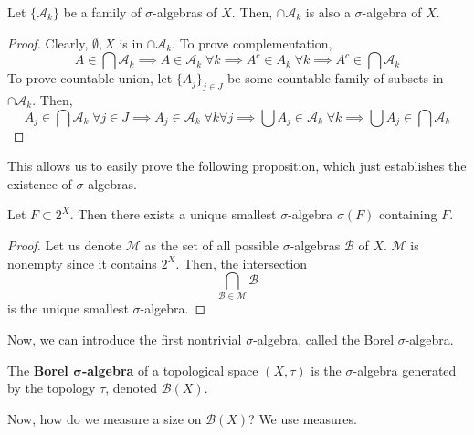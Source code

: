 \documentclass{article}
\begin{document}
\begin{theorem}
  Let $\{\mathcal{A}_k\}$ be a family of $\sigma$-algebras of $X$. Then, $\cap \mathcal{A}_k$ is also a $\sigma$-algebra of $X$. 
\end{theorem}
\begin{proof}
  Clearly, $\emptyset, X$ is in $\cap \mathcal{A}_k$. To prove complementation, 
  \begin{equation}
    A \in \bigcap \mathcal{A}_k \implies A \in \mathcal{A}_k \; \forall k \implies A^c \in A_k \; \forall k \implies A^c \in \bigcap \mathcal{A}_k
  \end{equation}
  To prove countable union, let $\{A_j\}_{j \in J}$ be some countable family of subsets in $\cap \mathcal{A}_k$. Then, 
  \begin{equation}
    A_j \in \bigcap \mathcal{A}_k \; \forall j \in J \implies A_j \in \mathcal{A}_k \; \forall k \forall j \implies \bigcup A_j \in \mathcal{A}_k \; \forall k \implies \bigcup A_j \in \bigcap \mathcal{A}_k
  \end{equation}
\end{proof}

This allows us to easily prove the following proposition, which just establishes the existence of $\sigma$-algebras. 

\begin{proposition}
  Let $F \subset 2^X$. Then there exists a unique smallest $\sigma$-algebra $\sigma(F)$ containing $F$. 
\end{proposition}
\begin{proof}
  Let us denote $\mathcal{M}$ as the set of all possible $\sigma$-algebras $\mathcal{B}$ of $X$. $\mathcal{M}$ is nonempty since it contains $2^X$. Then, the intersection 
  \[\bigcap_{\mathcal{B} \in \mathcal{M}} \mathcal{B}\]
  is the unique smallest $\sigma$-algebra. 
\end{proof}

Now, we can introduce the first nontrivial $\sigma$-algebra, called the Borel $\sigma$-algebra. 

\begin{definition}
  The \textbf{Borel $\boldsymbol{\sigma}$-algebra} of a topological space $(X, \tau)$ is the $\sigma$-algebra generated by the topology $\tau$, denoted $\mathcal{B}(X)$. 
\end{definition}

Now, how do we measure a size on $\mathcal{B}(X)$? We use measures. 
\end{document}
